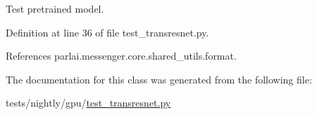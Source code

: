 \begin{DoxyVerb}Test pretrained model.\end{DoxyVerb}
 

Definition at line 36 of file test\+\_\+transresnet.\+py.



References parlai.\+messenger.\+core.\+shared\+\_\+utils.\+format.



The documentation for this class was generated from the following file\+:\begin{DoxyCompactItemize}
\item 
tests/nightly/gpu/\hyperlink{test__transresnet_8py}{test\+\_\+transresnet.\+py}\end{DoxyCompactItemize}
